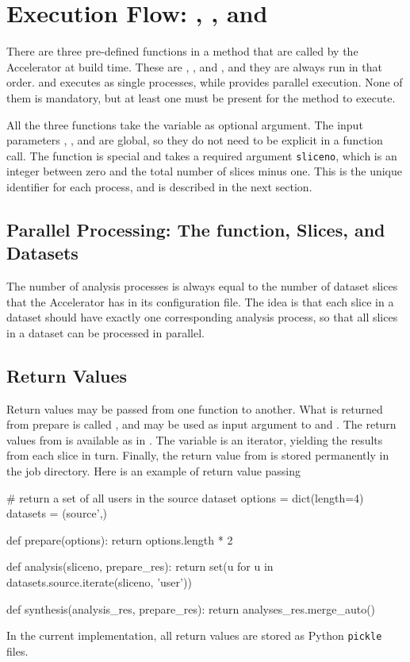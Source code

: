 


\newpage
\section{Execution Flow:  \prepare, \analysis, and \synthesis}

There are three pre-defined functions in a method that are called by
the Accelerator at build time.  These are \prepare, \analysis, and
\synthesis, and they are always run in that order.  \prepare and
\synthesis executes as single processes, while \analysis provides
parallel execution.  None of them is mandatory, but at least one must
be present for the method to execute.

All the three functions take the \params variable as optional
argument.  The input parameters \options, \jobids, and \datasets are
global, so they do not need to be explicit in a function call.  The
\analysis function is special and takes a required argument
\texttt{sliceno}, which is an integer between zero and the total
number of slices minus one.  This is the unique identifier for each
\analysis process, and is described in the next section.


\subsection{Parallel Processing:  The \analysis function, Slices, and Datasets}
The number of analysis processes is always equal to the number of
dataset slices that the Accelerator has in its configuration file.
The idea is that each slice in a dataset should have exactly one
corresponding analysis process, so that all slices in a dataset can be
processed in parallel.


\subsection{Return Values}
Return values may be passed from one function to another.  What is
returned from prepare is called \prepareres, and may be used as input
argument to \analysis and \synthesis.  The return values from
\analysis is available as \analysisres in \synthesis.  The
\analysisres variable is an iterator, yielding the results from each
slice in turn.  Finally, the return value from \synthesis is stored
permanently in the job directory.  Here is an example of return value
passing
\begin{python}
# return a set of all users in the source dataset
options = dict(length=4)
datasets = (source',)

def prepare(options):
    return options.length * 2

def analysis(sliceno, prepare_res):
    return set(u for u in datasets.source.iterate(sliceno, 'user'))

def synthesis(analysis_res, prepare_res):
     return analyses_res.merge_auto()
\end{python}
In the current implementation, all return values are stored as Python
\texttt{pickle} files.

